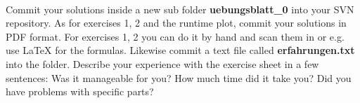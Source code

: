 \\
Commit your solutions inside a new sub folder
\textbf{uebungsblatt\_0\ExerciseSheetNumber} into your SVN repository.
As for exercises 1, 2 and the runtime plot,
commit your solutions in PDF format.
For exercises 1, 2 you can do it by hand and scan them in or e.g. use LaTeX
for the formulas.
Likewise commit a text file called \textbf{erfahrungen.txt} into the folder.
Describe your experience with the exercise sheet in a few sentences:
Was it manageable for you?
How much time did it take you?
Did you have problems with specific parts?

